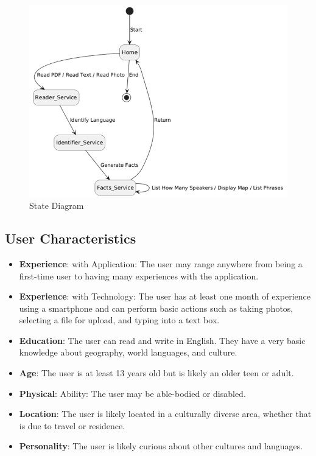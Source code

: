 \begin{figure}[H]
	\centering
	\includegraphics{Section2/State_Diagram.png}
	\caption{State Diagram}
	\label{StateDiagram}
\end{figure}


\subsection{User Characteristics}
\label{sub:user_characteristics}
\begin{itemize}
	\item \textbf{Experience}: with Application: The user may range anywhere from being a first-time user to having many experiences with the application.
	\item \textbf{Experience}: with Technology: The user has at least one month of experience using a smartphone and can perform basic actions such as taking photos, selecting a file for upload, and typing into a text box.
	\item \textbf{Education}: The user can read and write in English. They have a very basic knowledge about geography, world languages, and culture. 
	\item \textbf{Age}: The user is at least 13 years old but is likely an older teen or adult.
	\item \textbf{Physical}: Ability:  The user may be able-bodied or disabled.
	\item \textbf{Location}: The user is likely located in a culturally diverse area, whether that is due to travel or residence.
	\item \textbf{Personality}: The user is likely curious about other cultures and languages.
\end{itemize}


